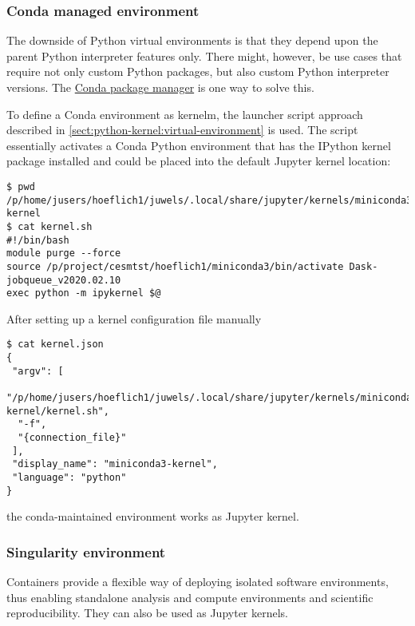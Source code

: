 \documentclass[11pt,a4paper]{article}
\begin{document}
\subsubsection{Conda managed environment}
\label{sect:conda-environment}

The downside of Python virtual environments is that they depend upon the parent Python interpreter features only.
There might, however, be use cases that require not only custom Python packages, but also custom Python interpreter versions.
The \href{https://conda.io/en/latest/}{Conda package manager} is one way to solve this.

To define a Conda environment as kernelm, the launcher script approach described in \ref{sect:python-kernel:virtual-environment} is used.
The script essentially activates a Conda Python environment that has the IPython kernel package installed and could be placed into the default Jupyter kernel location:
%
\begin{verbatim}
$ pwd
/p/home/jusers/hoeflich1/juwels/.local/share/jupyter/kernels/miniconda3-kernel
$ cat kernel.sh
#!/bin/bash
module purge --force
source /p/project/cesmtst/hoeflich1/miniconda3/bin/activate Dask-jobqueue_v2020.02.10
exec python -m ipykernel $@
\end{verbatim}

After setting up a kernel configuration file manually
%
\begin{verbatim}
$ cat kernel.json
{
 "argv": [
  "/p/home/jusers/hoeflich1/juwels/.local/share/jupyter/kernels/miniconda3-kernel/kernel.sh",
  "-f",
  "{connection_file}"
 ],
 "display_name": "miniconda3-kernel",
 "language": "python"
}
\end{verbatim}
%
the conda-maintained environment works as Jupyter kernel.


\subsubsection{Singularity environment}
\label{sect:container-based-environment}

Containers provide a flexible way of deploying isolated software environments, thus enabling standalone analysis and compute environments and scientific reproducibility.
They can also be used as Jupyter kernels.
\end{document}
